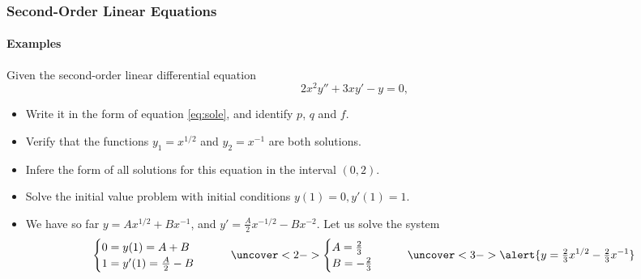 \documentclass[9pt,xcolor=x11names,compress]{beamer}
\begin{document}
\begin{frame}\frametitle{Second-Order Linear Equations}
\framesubtitle{Examples}
\begin{block}{Given the second-order linear differential equation}
\begin{equation*}
	2x^2y''+3xy'-y=0,
\end{equation*}
\begin{itemize}
	\item Write it in the form of equation \eqref{eq:sole}, and identify $p$, $q$ and $f$.
	\item Verify that the functions $y_1=x^{1/2}$ and $y_2=x^{-1}$ are both solutions.
	\item Infere the form of all solutions for this equation in the interval $(0,2)$.
	\item \alert{Solve the initial value problem with initial conditions $y(1)=0, y'(1)=1$.}
\end{itemize}
\end{block}
\begin{itemize}
\item We have so far $y=Ax^{1/2}+Bx^{-1}$, and $y'=\tfrac{A}{2}x^{-1/2}-Bx^{-2}$.  Let us solve the system
\begin{equation*}
	\begin{cases}
		0=y(1)=A+B \\
		1=y'(1)=\tfrac{A}{2}-B
	\end{cases}\qquad
	\uncover<2->{
	\begin{cases}
		A=\tfrac{2}{3} \\ B=-\tfrac{2}{3}
	\end{cases}}\qquad
	\uncover<3->{\alert{y=\tfrac{2}{3}x^{1/2}-\tfrac{2}{3}x^{-1}}}
\end{equation*}
\end{itemize}
\end{frame}
\end{document}
